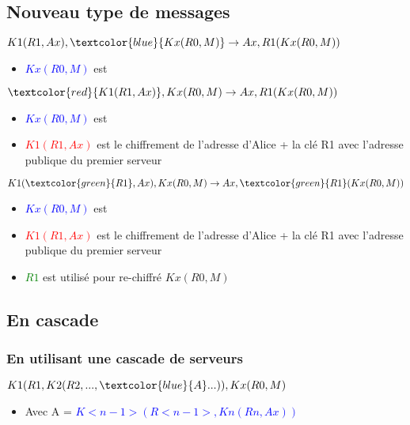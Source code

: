 \documentclass{beamer}
\begin{document}
\subsection{Nouveau type de messages}
\begin{frame}
\begin{center}
$K1( R1, Ax ), \textcolor{blue}{Kx( R0, M )} \rightarrow Ax, R1( Kx( R0, M ))$
\end{center}
\begin{itemize}
[triangle]
\item \textcolor{blue}{$Kx( R0, M )$} est 
\end{itemize}
\end{frame}

\begin{frame}
\begin{center}
$\textcolor{red}{K1( R1, Ax )}, Kx( R0, M ) \rightarrow Ax, R1( Kx( R0, M ))$
\end{center}
\begin{itemize}
[triangle]
\item \textcolor{blue}{$Kx( R0, M )$} est 
\item \textcolor{red}{$K1( R1, Ax )$} est le chiffrement de l'adresse d'Alice + la clé R1 avec l'adresse publique du premier serveur
\end{itemize}
\end{frame}

\begin{frame}
\begin{center}
$K1( \textcolor{green}{R1}, Ax ), Kx( R0, M ) \rightarrow Ax, \textcolor{green}{R1}( Kx( R0, M ))$
\end{center}
\begin{itemize}
[triangle]
\item \textcolor{blue}{$Kx( R0, M )$} est 
\item \textcolor{red}{$K1( R1, Ax )$} est le chiffrement de l'adresse d'Alice + la clé R1
 avec l'adresse publique du premier serveur
\item \textcolor{green}{$R1$} est utilisé pour re-chiffré $Kx( R0, M )$
\end{itemize}
\end{frame}

\subsection{En cascade}
\begin{frame}
\frametitle{En utilisant une cascade de serveurs}
\begin{center}
$K1( R1, K2( R2, ..., \textcolor{blue}{A} ...)), Kx( R0, M )$
\end{center}
\begin{itemize}
[triangle]
\item Avec A = \textcolor{blue}{$K<n-1>( R<n-1>, Kn( Rn, Ax ))$}
\end{itemize}
\end{frame}
\end{document}
